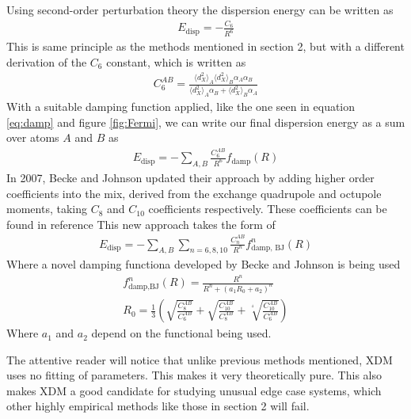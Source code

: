 \documentclass[10pt,a4paper,twocolumn,twoside]{extarticle}
\begin{document}
	Using second-order perturbation theory\cite{XDM-dipole} the dispersion energy can be written as 
	\begin{align}
		E_\text{disp} = -\frac{C_6}{R^6}
	\end{align}
	This is same principle as the methods mentioned in section 2, but with a different derivation of the $C_6$ constant, which is written as
	\begin{align}
		C_6^{AB} = \frac{\langle d_X^2 \rangle_A \langle d_X^2 \rangle_B \alpha_A \alpha_B}{\langle d_X^2 \rangle_A\alpha_B + \langle d_X^2 \rangle_B\alpha_A}
	\end{align} 
	With a suitable damping function applied, like the one seen in equation \ref{eq:damp} and figure \ref{fig:Fermi}, we can write our final dispersion energy as a sum over atoms $A$ and $B$ as 
	\begin{align}
		E_\text{disp} = - \sum_{A,B} \frac{C_6^{AB}}{R^6} f_\text{damp}(R)
	\end{align}
	In 2007, Becke and Johnson updated their approach\cite{XDM-Revisited} by adding higher order coefficients into the mix, derived from the exchange quadrupole and octupole moments, taking $C_8$ and $C_{10}$ coefficients respectively. These coefficients can be found in reference \cite{XDM-Revisited} This new approach takes the form of 
	\begin{align}
		E_\text{disp} = -\sum_{A,B} \sum_{n=6,8,10} \frac{C_n^{AB}}{R^n} f^n_\text{damp, BJ}(R)
	\end{align}
	Where a novel damping functiona developed by Becke and Johnson is being used \cite{BJ-Damp}
	\begin{align}
		f^n_\text{damp,BJ} (R) = \frac{R^n}{R^n + (a_1 R_0 + a_2)^n}\\
		R_0 = \frac{1}{3} \left( \sqrt{\frac{C_8^{AB}}{C_6^{AB}}} + \sqrt{\frac{C_{10}^{AB}}{C_8^{AB}}}
		+ \sqrt[^4]{\frac{C_{10}^{AB}}{C_6^{AB}}} \right)
	\end{align}
	Where $a_1$ and $a_2$ depend on the functional being used.
	
	The attentive reader will notice that unlike previous methods mentioned, XDM uses no fitting of parameters. This makes it very theoretically pure. This also makes XDM a good candidate for studying unusual edge case systems, which other highly empirical methods like those in section 2 will fail. 
\end{document}
